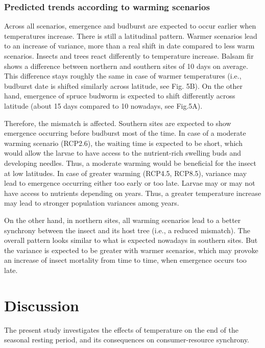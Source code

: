 \documentclass[12 pt]{article}
\begin{document}
\subsubsection{Predicted trends according to warming scenarios}
Across all scenarios, emergence and budburst are expected to occur earlier when temperatures increase. There is still a latitudinal pattern. Warmer scenarios lead to an increase of variance, more than a real shift in date compared to less warm scenarios. Insects and trees react differently to temperature increase. Balsam fir shows a difference between northern and southern sites of 10 days on average. This difference stays roughly the same in case of warmer temperatures (i.e., budburst date is shifted similarly across latitude, see Fig. 5B). On the other hand, emergence of spruce budworm is expected to shift differently across latitude (about 15 days compared to 10 nowadays, see Fig.5A). \par
Therefore, the mismatch is affected. Southern sites are expected to show emergence occurring before budburst most of the time. In case of a moderate warming scenario (RCP2.6), the waiting time is expected to be short, which would allow the larvae to have access to the nutrient-rich swelling buds and developing needles. Thus, a moderate warming would be beneficial for the insect at low latitudes. In case of greater warming (RCP4.5, RCP8.5), variance may lead to emergence occurring either too early or too late. Larvae may or may not have access to nutrients depending on years. Thus, a greater temperature increase may lead to stronger population variances among years. \par
On the other hand, in northern sites, all warming scenarios lead to a better synchrony between the insect and its host tree (i.e., a reduced mismatch). The overall pattern looks similar to what is expected nowadays in southern sites. But the variance is expected to be greater with warmer scenarios, which may provoke an increase of insect mortality from time to time, when emergence occurs too late.   

\section{Discussion}
The present study investigates the effects of temperature on the end of the seasonal resting period, and its consequences on consumer-resource synchrony. 
\end{document}
